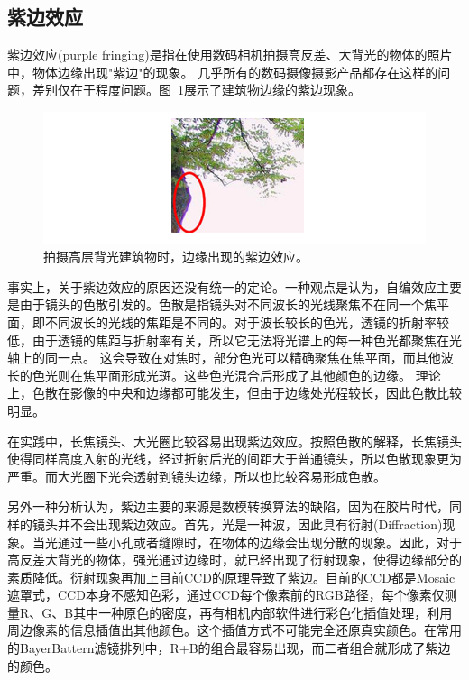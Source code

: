 \documentclass{ctexart}
\begin{document}
\subsection{紫边效应\cite{chromatic_aberration1, chromatic_aberration2}}
紫边效应(purple fringing)是指在使用数码相机拍摄高反差、大背光的物体的照片中，物体边缘出现"紫边"的现象。
几乎所有的数码摄像摄影产品都存在这样的问题，差别仅在于程度问题。图~\ref{fig_purple_fringing}展示了建筑物边缘的紫边现象。
\begin{figure}[h]
    \centering
    \includegraphics[width=.80\textwidth]{imgs/purple_fringing.jpg}
    \caption{拍摄高层背光建筑物时，边缘出现的紫边效应。}
    \label{fig_purple_fringing}
\end{figure}

事实上，关于紫边效应的原因还没有统一的定论。一种观点是认为，自编效应主要是由于镜头的色散引发的。色散是指镜头对不同波长的光线聚焦不在同一个焦平面，即不同波长的光线的焦距是不同的。对于波长较长的色光，透镜的折射率较低，由于透镜的焦距与折射率有关，所以它无法将光谱上的每一种色光都聚焦在光轴上的同一点。
这会导致在对焦时，部分色光可以精确聚焦在焦平面，而其他波长的色光则在焦平面形成光斑。这些色光混合后形成了其他颜色的边缘。
理论上，色散在影像的中央和边缘都可能发生，但由于边缘处光程较长，因此色散比较明显。

在实践中，长焦镜头、大光圈比较容易出现紫边效应。按照色散的解释，长焦镜头使得同样高度入射的光线，经过折射后光的间距大于普通镜头，所以色散现象更为严重。而大光圈下光会透射到镜头边缘，所以也比较容易形成色散。

另外一种分析认为，紫边主要的来源是数模转换算法的缺陷，因为在胶片时代，同样的镜头并不会出现紫边效应。首先，光是一种波，因此具有衍射(Diffraction)现象。当光通过一些小孔或者缝隙时，在物体的边缘会出现分散的现象。因此，对于高反差大背光的物体，强光通过边缘时，就已经出现了衍射现象，使得边缘部分的素质降低。衍射现象再加上目前CCD的原理导致了紫边。目前的CCD都是Mosaic遮罩式，CCD本身不感知色彩，通过CCD每个像素前的RGB路径，每个像素仅测量R、G、B其中一种原色的密度，再有相机内部软件进行彩色化插值处理，利用周边像素的信息插值出其他颜色。这个插值方式不可能完全还原真实颜色。在常用的BayerBattern滤镜排列中，R+B的组合最容易出现，而二者组合就形成了紫边的颜色。
\end{document}
